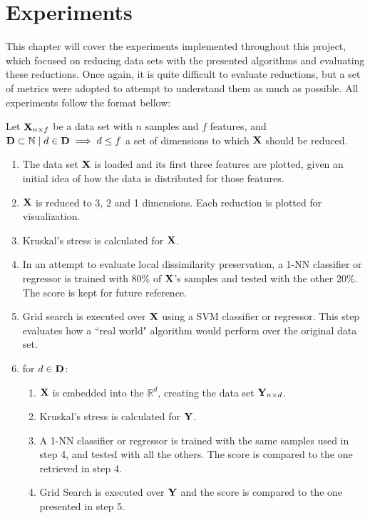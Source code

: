 \chapter{Experiments}
\label{sec:experiments}

This chapter will cover the experiments implemented throughout this project, which focused on reducing data sets with the presented algorithms and evaluating these reductions. Once again, it is quite difficult to evaluate reductions, but a set of metrics were adopted to attempt to understand them as much as possible. All experiments follow the format bellow:

Let $\mathbf{X}_{n \times f}$ be a data set with $n$ samples and $f$ features, and $\mathbf{D} \subset \mathbb{N} \mid d \in \mathbf{D} \implies d \le f$ a  set of dimensions to which $\mathbf{X}$ should be reduced.

\begin{enumerate}
	\item The data set $\mathbf{X}$ is loaded and its first three features are plotted, given an initial idea of how the data is distributed for those features.
	\item $\mathbf{X}$ is reduced to 3, 2 and 1 dimensions. Each reduction is plotted for visualization.
	\item Kruskal's stress is calculated for $\mathbf{X}$.
	\item In an attempt to evaluate local dissimilarity preservation, a 1-NN classifier or regressor is trained with 80\% of $\mathbf{X}$'s samples and tested with the other 20\%. The score is kept for future reference.
	\item Grid search is executed over $\mathbf{X}$ using a SVM classifier or regressor. This step evaluates how a ``real world" algorithm would perform over the original data set.
	\item for $d \in \mathbf{D}$:
	\begin{enumerate}
		\item $\mathbf{X}$ is embedded into the $\mathbb{R}^d$, creating the data set $\mathbf{Y}_{n \times d}$.
		\item Kruskal's stress is calculated for $\mathbf{Y}$.
		\item A 1-NN classifier or regressor is trained with the same samples used in step 4, and tested with all the others. The score is compared to the one retrieved in step 4.
		\item Grid Search is executed over $\mathbf{Y}$ and the score is compared to the one presented in step 5.
	\end{enumerate}
\end{enumerate}

